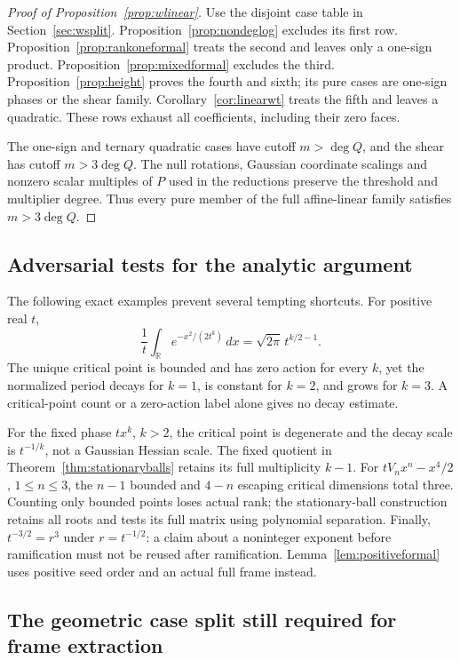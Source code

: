 \begin{proof}[Proof of Proposition~\ref{prop:wlinear}]
Use the disjoint case table in Section~\ref{sec:wsplit}.
Proposition~\ref{prop:nondeglog} excludes its first row.
Proposition~\ref{prop:rankoneformal} treats the second and leaves
only a one-sign product. Proposition~\ref{prop:mixedformal} excludes
the third. Proposition~\ref{prop:height} proves the fourth and sixth;
its pure cases are one-sign phases or the shear family.
Corollary~\ref{cor:linearwt} treats the fifth and leaves a quadratic.
These rows exhaust all coefficients, including their zero faces.

The one-sign and ternary quadratic cases have cutoff $m>\deg Q$,
and the shear has cutoff $m>3\deg Q$. The null rotations,
Gaussian coordinate scalings and nonzero scalar multiples of $P$
used in the reductions preserve the threshold and multiplier degree.
Thus every pure member of the full affine-linear family satisfies
$m>3\deg Q$.
\end{proof}

\subsection{Adversarial tests for the analytic argument}

The following exact examples prevent several tempting shortcuts.
For positive real $t$,
\[
 \frac1t\int_{\mathbb R}e^{-x^2/(2t^k)}\,dx
   =\sqrt{2\pi}\,t^{k/2-1}.
\]
The unique critical point is bounded and has zero action for every
$k$, yet the normalized period decays for $k=1$, is constant for
$k=2$, and grows for $k=3$. A critical-point count or a zero-action
label alone gives no decay estimate.

For the fixed phase $tx^k$, $k>2$, the critical point is degenerate
and the decay scale is $t^{-1/k}$, not a Gaussian Hessian scale.
The fixed quotient in Theorem~\ref{thm:stationaryballs}
retains its full multiplicity $k-1$.
For $tV_nx^n-x^4/2$, $1\leq n\leq3$, the $n-1$ bounded and
$4-n$ escaping critical dimensions total three. Counting only
bounded points loses actual rank; the stationary-ball construction
retains all roots and tests its full matrix using polynomial separation.
Finally, $t^{-3/2}=r^3$ under $r=t^{-1/2}$: a claim about a
noninteger exponent before ramification must not be reused after
ramification. Lemma~\ref{lem:positiveformal} uses positive seed order
and an actual full frame instead.

\subsection{The geometric case split still required for frame extraction}

